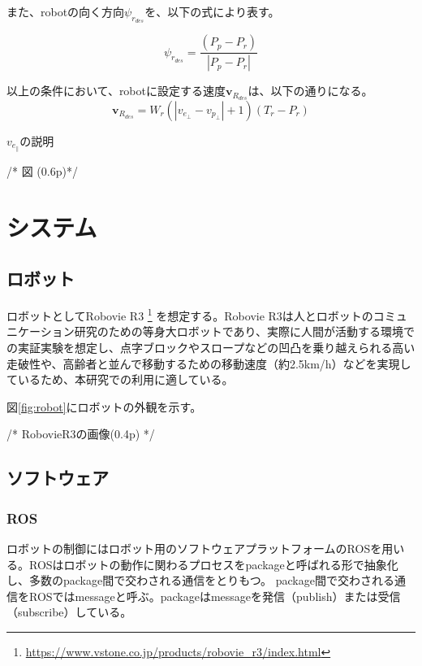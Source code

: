 \documentclass{kuisthesis}
\begin{document}
また、robotの向く方向$\psi_r_{des}$を、以下の式により表す。

\begin{equation}
	\psi_r_{des} = \frac{(P_p - P_r)}{|P_p - P_r|} \nonumber
\end{equation}

以上の条件において、robotに設定する速度$\bm{v}_R_{des}$は、以下の通りになる。
\begin{equation}
	\bm{v}_R_{des} = W_r (|v_e_{\perp} - v_p_{\perp}|+1)(T_r - P_r) \nonumber
\end{equation}

$v_e_{\parallel}$の説明

/* 図 (0.6p)*/






\section{システム}

\subsection{ロボット}

ロボットとしてRobovie R3 \footnote{\url{https://www.vstone.co.jp/products/robovie_r3/index.html}} を想定する。Robovie R3は人とロボットのコミュニケーション研究のための等身大ロボットであり、実際に人間が活動する環境での実証実験を想定し、点字ブロックやスロープなどの凹凸を乗り越えられる高い走破性や、高齢者と並んで移動するための移動速度（約2.5km/h）などを実現しているため、本研究での利用に適している。

図\ref{fig:robot}にロボットの外観を示す。

/* RobovieR3の画像(0.4p) */

\subsection{ソフトウェア}


\subsubsection*{ROS}
ロボットの制御にはロボット用のソフトウェアプラットフォームのROSを用いる。ROSはロボットの動作に関わるプロセスをpackageと呼ばれる形で抽象化し、多数のpackage間で交わされる通信をとりもつ。
package間で交わされる通信をROSではmessageと呼ぶ。packageはmessageを発信（publish）または受信（subscribe）している。
\end{document}
